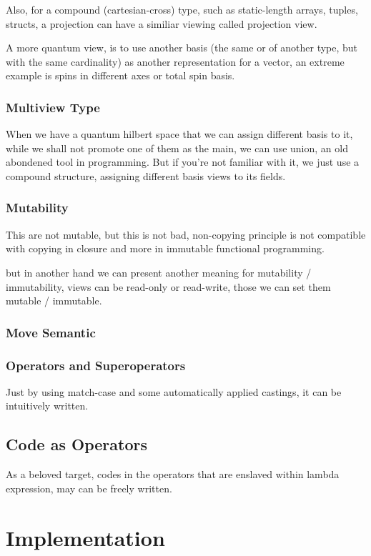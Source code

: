 \documentclass[a4paper,11pt]{article}
\begin{document}
Also, for a compound (cartesian-cross) type, such as static-length arrays, tuples, structs, a projection can have a similiar viewing called projection view.

A more quantum view, is to use another basis (the same or of another type, but with the same cardinality) as another representation for a vector, an extreme example is spins in different axes or total spin basis.

\subsubsection{Multiview Type}

When we have a quantum hilbert space that we can assign different basis to it, while we shall not promote one of them as the main, we can use union, an old abondened tool in programming. But if you're not familiar with it, we just use a compound structure, assigning different basis views to its fields. 

\subsubsection{Mutability}

This are not mutable, but this is not bad, non-copying principle is not compatible with copying in closure and more in immutable functional programming.

but in another hand we can present another meaning for mutability / immutability, 
views can be read-only or read-write, those we can set them mutable / immutable.

\subsubsection{Move Semantic}

\subsubsection{Operators and Superoperators}
Just by using match-case and some automatically applied castings, it can be intuitively written.

\subsection{Code as Operators}
As a beloved target, codes in the operators that are enslaved within lambda expression, may can be freely written. 

\section{Implementation}
\end{document}
